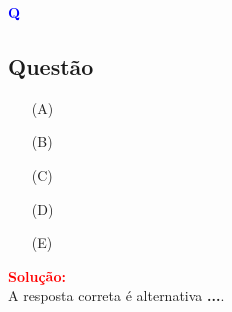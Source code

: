 \begin{flushleft}
\textbf{\textcolor{blue}{\Large Q}}\\
\noindent

\subsection{Quest\~ao }

\begin{itemize}
\item[(A)] 
\item[(B)] 
\item[(C)] 
\item[(D)] 
\item[(E)] 
\end{itemize}

\vspace{0.5cm}

\textcolor{red}{\textbf{Solução:}}\\

A resposta correta é alternativa \colorbox{green!50}{\textbf{...}}.
\end{flushleft}